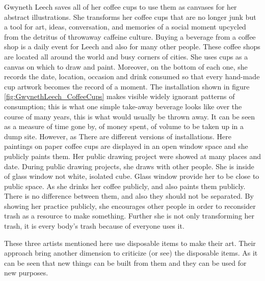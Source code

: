 Gwyneth Leech saves all of her coffee cups to use them as canvases for her abstract illustrations. She transforms her coffee cups that are no longer junk but a tool for art, ideas, conversation, and memories of a social moment upcycled from the detritus of throwaway caffeine culture. Buying a beverage from a coffee shop is a daily event for Leech and also for many other people. These coffee shops are located all around the world and busy corners of cities. She uses cups as a canvas on which to draw and paint. Moreover, on the bottom of each one, she records the date, location, occasion and drink consumed so that every hand-made cup artwork becomes the record of a moment. The installation shown in figure \ref{fig:GwynethLeech_CoffeeCups} makes visible widely ignorant patterns of consumption; this is what one simple take-away beverage looks like over the course of many years, this is what would usually be thrown away. It can be seen as a measure of time gone by, of money spent, of volume to be taken up in a dump site. However, as \cite{leech2015cups}  There are different versions of installations. Here paintings on paper coffee cups are displayed in an open window space and she publicly paints them. Her public drawing project were showed at many places and date. During public drawing projects, she draws with other people. She is inside of glass window not white, isolated cube. Glass window provide her to be close to public space. As she drinks her coffee publicly, and also paints them publicly. There is no difference between them, and also they should not be separated. By showing her practice publicly, she encourages other people in order to reconsider trash as a resource to make something. Further she is not only transforming her trash, it is every body’s trash because of everyone uses it.

These three artists mentioned here use disposable items to make their art. Their approach bring another dimension to criticize (or see) the disposable items. As it can be seen that new things can be built from them and they can be used for new purposes.

